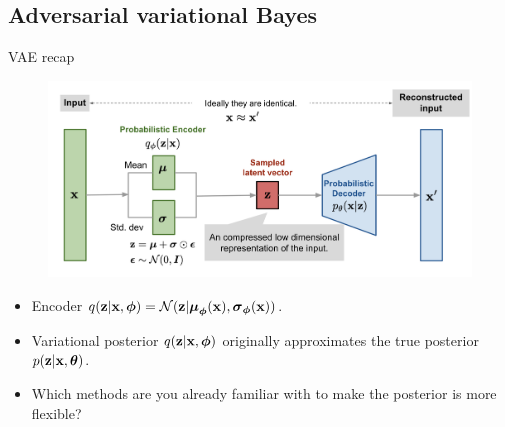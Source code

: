 \documentclass{beamer}
\begin{document}
\subsection{Adversarial variational Bayes}
\begin{frame}{VAE recap}
	\vspace{-0.3cm}
	\begin{figure}[h]
		\centering
		\includegraphics[width=\linewidth]{figs/vae-gaussian.png}
	\end{figure}
	\vspace{-0.5cm}
	\begin{itemize}
		\item Encoder $q(\mathbf{z} | \mathbf{x}, \boldsymbol{\phi}) = \mathcal{N}(\mathbf{z} | \boldsymbol{\mu}_{\boldsymbol{\phi}}(\mathbf{x}), \boldsymbol{\sigma}_{\boldsymbol{\phi}}(\mathbf{x}))$.
		\item Variational posterior $q(\mathbf{z} | \mathbf{x}, \boldsymbol{\phi})$ originally approximates the true posterior $p(\mathbf{z} | \mathbf{x}, \boldsymbol{\theta})$.
		\item Which methods are you already familiar with to make the posterior is more flexible?
	\end{itemize}
\end{frame}
\end{document}
